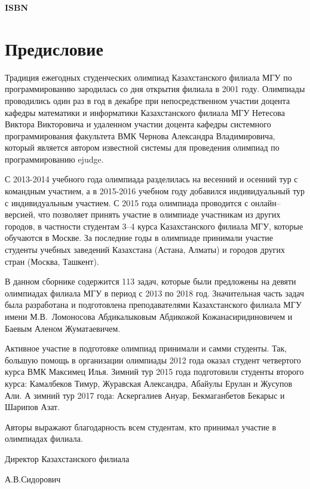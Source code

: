 \documentclass[11pt, a5paper]{article}
\begin{document}
\vspace{0.5 cm}


{\bf ISBN}  

\newpage
\section{Предисловие}

Традиция ежегодных студенческих олимпиад Казахстанского филиала МГУ по программированию зародилась со дня открытия филиала в 2001 году. Олимпиады проводились один раз в год в декабре при непосредственном участии доцента кафедры математики и информатики Казахстанского филиала МГУ Нетесова Виктора Викторовича и удаленном участии доцента кафедры системного программирования факультета ВМК Чернова Александра Владимировича, который является автором известной системы для проведения олимпиад по программированию ejudge. 

С 2013-2014 учебного года олимпиада разделилась на весенний и осенний тур с командным участием, а в 2015-2016 учебном году добавился индивидуальный тур с индивидуальным участием. С 2015 года олимпиада проводится с онлайн--версией, что позволяет принять участие в олимпиаде участникам из других городов, в частности студентам 3--4 курса Казахстанского филиала МГУ, которые обучаются в Москве. За последние годы в олимпиаде принимали участие студенты учебных заведений Казахстана (Астана, Алматы) и городов других стран (Москва, Ташкент).

В данном сборнике содержится 113 задач, которые были предложены на девяти олимпиадах филиала МГУ в период с 2013 по 2018 год. Значительная часть задач была разработана и подготовлена преподавателями Казахстанского филиала МГУ имени М.В.~Ломоносова Абдикалыковым Абдикожой Кожанасиридиновичем и Баевым Аленом Жуматаевичем. 

Активное участие в подготовке олимпиад принимали и самми студенты. Так, большую помощь в организации олимпиады 2012 года оказал студент четвертого курса ВМК Максимец Илья. Зимний тур 2015 года подготовили студенты второго курса: Камалбеков Тимур, Журавская Александра, Абайулы Ерулан и Жусупов Али. А зимний тур 2017 года: Аскергалиев Ануар, Бекмаганбетов Бекарыс и Шарипов Азат.

Авторы выражают благодарность всем студентам, кто принимал участие в олимпиадах филиала.

\begin{flushright}
Директор Казахстанского филиала

А.В.Сидорович
\end{flushright}
\end{document}
